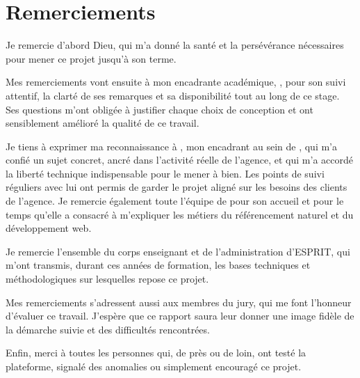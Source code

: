 \chapter*{Remerciements}

Je remercie d'abord Dieu, qui m'a donné la santé et la persévérance nécessaires pour mener ce projet jusqu'à son terme.

Mes remerciements vont ensuite à mon encadrante académique, \encadrantacad, pour son suivi attentif, la clarté de ses remarques et sa disponibilité tout au long de ce stage. Ses questions m'ont obligée à justifier chaque choix de conception et ont sensiblement amélioré la qualité de ce travail.

Je tiens à exprimer ma reconnaissance à \encadrantent, mon encadrant au sein de \organisme, qui m'a confié un sujet concret, ancré dans l'activité réelle de l'agence, et qui m'a accordé la liberté technique indispensable pour le mener à bien. Les points de suivi réguliers avec lui ont permis de garder le projet aligné sur les besoins des clients de l'agence. Je remercie également toute l'équipe de \organisme{} pour son accueil et pour le temps qu'elle a consacré à m'expliquer les métiers du référencement naturel et du développement web. 

Je remercie l'ensemble du corps enseignant et de l'administration d'ESPRIT, qui m'ont transmis, durant ces années de formation, les bases techniques et méthodologiques sur lesquelles repose ce projet.

Mes remerciements s'adressent aussi aux membres du jury, qui me font l'honneur d'évaluer ce travail. J'espère que ce rapport saura leur donner une image fidèle de la démarche suivie et des difficultés rencontrées.

Enfin, merci à toutes les personnes qui, de près ou de loin, ont testé la plateforme, signalé des anomalies ou simplement encouragé ce projet.

\vspace{1cm}
\begin{flushright}
\auteur
\end{flushright}
